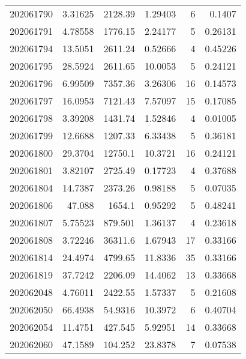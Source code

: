 \begin{tabular}{rrrrrr}
 202061790 &          3.31625 &     2128.39   &            1.29403 &           6 & 0.1407  \\
 202061791 &          4.78558 &     1776.15   &            2.24177 &           5 & 0.26131 \\
 202061794 &         13.5051  &     2611.24   &            0.52666 &           4 & 0.45226 \\
 202061795 &         28.5924  &     2611.65   &           10.0053  &           5 & 0.24121 \\
 202061796 &          6.99509 &     7357.36   &            3.26306 &          16 & 0.14573 \\
 202061797 &         16.0953  &     7121.43   &            7.57097 &          15 & 0.17085 \\
 202061798 &          3.39208 &     1431.74   &            1.52846 &           4 & 0.01005 \\
 202061799 &         12.6688  &     1207.33   &            6.33438 &           5 & 0.36181 \\
 202061800 &         29.3704  &    12750.1    &           10.3721  &          16 & 0.24121 \\
 202061801 &          3.82107 &     2725.49   &            0.17723 &           4 & 0.37688 \\
 202061804 &         14.7387  &     2373.26   &            0.98188 &           5 & 0.07035 \\
 202061806 &         47.088   &     1654.1    &            0.95292 &           5 & 0.48241 \\
 202061807 &          5.75523 &      879.501  &            1.36137 &           4 & 0.23618 \\
 202061808 &          3.72246 &    36311.6    &            1.67943 &          17 & 0.33166 \\
 202061814 &         24.4974  &     4799.65   &           11.8336  &          35 & 0.33166 \\
 202061819 &         37.7242  &     2206.09   &           14.4062  &          13 & 0.33668 \\
 202062048 &          4.76011 &     2422.55   &            1.57337 &           5 & 0.21608 \\
 202062050 &         66.4938  &       54.9316 &           10.3972  &           6 & 0.40704 \\
 202062054 &         11.4751  &      427.545  &            5.92951 &          14 & 0.33668 \\
 202062060 &         47.1589  &      104.252  &           23.8378  &           7 & 0.07538 \\

\end{tabular}
